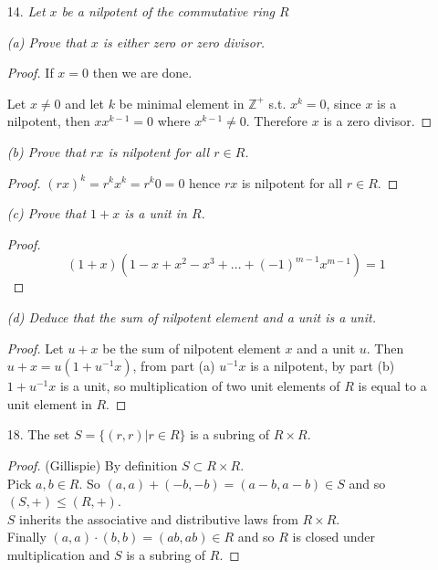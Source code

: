 \documentclass[10pt]{article}
\newcommand{\Z}{\mathbb{Z}}
\begin{document}
\begin{itemize}
The nilpotent elements of $\Z/72\Z$ are
$0, 6, 12, 18, 24, 30, 36, 42, 48, 54, 60, 66$.

\emph{(c) Let $R$ be a ring of functions from nonempty set $X$ to
a field $F$. Prove that $R$ contains no nonzero nilpotent element
}
\begin{proof}
Let $f$ be a nonzero nilpotent element in $R$ then there exist
$x\in X$ s.t. $f(x)\ne0$. Since $f$ is nilpotent, then
$f^k\equiv0$ for some $k\in \Z^+$, then $f^k(x)=[f(x)]^k=0$ from
which it follows that $f(x)=0$, but this is a contradiction. Hence
$R$ contains no nonzero nilpotent element.
\end{proof}


\item[14.]\emph{Let $x$ be a nilpotent of the commutative ring
$R$}

\emph{(a) Prove that $x$ is either zero or zero divisor.}
\begin{proof}
If $x=0$ then we are done.

Let $x\ne0$ and let $k$ be minimal element in $\Z^+$ s.t. $x^k=0$,
since $x$ is a nilpotent, then $xx^{k-1}=0$ where $x^{k-1}\ne0$.
Therefore $x$ is a zero divisor.
\end{proof}

\emph{(b) Prove that $rx$ is nilpotent for all $r\in R$.}
\begin{proof}
$(rx)^k=r^kx^k=r^k0=0$ hence $rx$ is nilpotent for all $r\in R$.
\end{proof}

\emph{(c) Prove that $1+x$ is a unit in $R$.}
\begin{proof}
$$(1+x)(1-x+x^2-x^3+...+(-1)^{m-1}x^{m-1})=1$$
\end{proof}

\emph{(d)  Deduce that the sum of nilpotent element and a unit is
a unit.}
\begin{proof}
Let $u+x$ be the sum of nilpotent element $x$ and a unit $u$. Then
$u+x=u(1+u^{-1}x)$, from part (a) $u^{-1}x$ is a nilpotent, by
part (b) $1+u^{-1}x$ is a unit, so multiplication of two unit
elements of $R$ is equal to a unit element in $R$.
\end{proof}

\item[18.]  The set $S=\{(r,r)|r\in R\}$ is a subring of $R\times R$.

\begin{proof}(Gillispie) By definition $S\subset R\times R$.\\
Pick $a,b\in R$. So $(a,a)+(-b,-b)=(a-b,a-b)\in S$ and so $(S,+)\le(R,+)$.\\
$S$ inherits the associative and distributive laws from $R\times R$.\\
Finally $(a,a)\cdot(b,b)=(ab,ab)\in R$ and so $R$ is closed under
multiplication and $S$ is a subring of $R$.
\end{proof}

\end{itemize}
\end{document}
